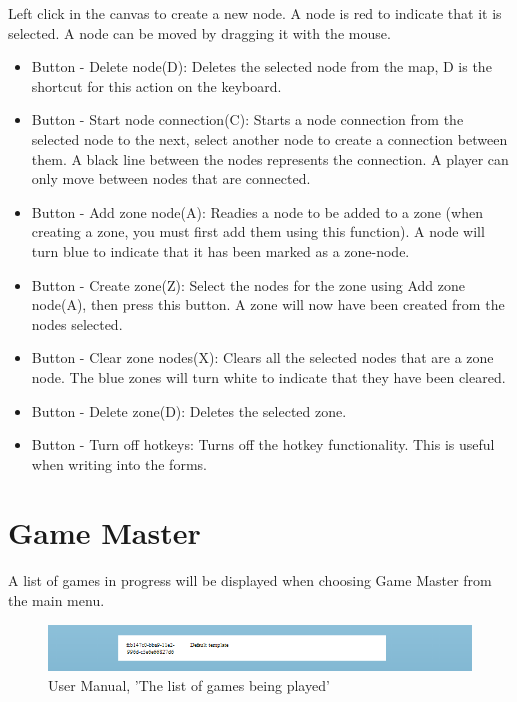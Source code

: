 \noindent Left click in the canvas to create a new node. A node is red to indicate that it is selected. A node can be moved by dragging it with the mouse.
 
\begin{itemize}
\item Button - Delete node(D): Deletes the selected node from the map, D is the shortcut for this action on the keyboard.
\item Button - Start node connection(C): Starts a node connection from the selected node to the next, select another node to create a connection between them. A black line between the nodes represents the connection. A player can only move between nodes that are connected.
\item Button - Add zone node(A): Readies a node to be added to a zone (when creating a zone, you must first add them using this function). A node will turn blue to indicate that it has been marked as a zone-node.
\item Button - Create zone(Z): Select the nodes for the zone using Add zone node(A), then press this button. A zone will now have been created from the nodes selected.
\item Button - Clear zone nodes(X): Clears all the selected nodes that are a zone node. The blue zones will turn white to indicate that they have been cleared.
\item Button - Delete zone(D): Deletes the selected zone.
\item Button - Turn off hotkeys: Turns off the hotkey functionality. This is useful when writing into the forms.
\end{itemize}

\section{Game Master}

A list of games in progress will be displayed when choosing Game Master from the main menu.

\begin{figure}[H]
  \centering
    \includegraphics[width=1.0\textwidth]{img/gamemasterlist.png}
  \caption{User Manual, 'The list of games being played'}
  \label{fig:replaylist}
\end{figure}

